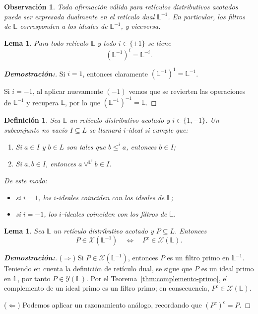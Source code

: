 \documentclass[12pt]{book}
\newtheorem{lemma}[theorem]{Lema}
\newtheorem{definition}[theorem]{Definición}
\newtheorem{remark}[theorem]{Observación}
\begin{document}
\begin{remark} Toda afirmación válida para retículos distributivos acotados puede ser expresada dualmente en el retículo  dual \( \mathbb{L}^{-1} \).
En particular, los filtros de \( \mathbb{L} \) corresponden a los ideales de \( \mathbb{L}^{-1} \),
y viceversa.
\end{remark}

\begin{lemma}\label{lem:Li-dual}
Para todo retículo $\mathbb{L}$ y todo $i\in\{\pm1\}$ se tiene
\[
(\mathbb{L}^{-1})^{i}=\mathbb{L}^{-i}.
\]
\end{lemma}

\begin{proof}[{\textbf{Demostración:}}]
Si $i=1$, entonces claramente $(\mathbb{L}^{-1})^{1}=\mathbb{L}^{-1}$.

Si $i=-1$, al aplicar nuevamente $(-1)$ vemos que se revierten las operaciones de $\mathbb{L}^{-1}$ y recupera $\mathbb{L}$, por lo que $\left(\mathbb{L}^{-1}\right)^{-1}=\mathbb{L}$.
\end{proof}

\begin{definition}\label{def:i-ideal}
Sea $\mathbb{L}$ un retículo distributivo acotado y $i\in\{1,-1\}$.
Un subconjunto no vacío $I\subseteq L$ se llamará \emph{$i$-ideal} si cumple que:
\begin{enumerate}[\normalfont 1)]
\item Si $a\in I$ y $b\in L$ son tales que $b\le^i a$, entonces $b\in I$;
\item Si $a,b\in I$, entonces $a\vee^{\mathbb{L}^i} b\in I$.
\end{enumerate}
De este modo:
\begin{itemize}
  \item si $i=1$, los $i$-ideales coinciden con los ideales de $\mathbb{L}$;
  \item si $i=-1$, los $i$-ideales coinciden con los filtros de $\mathbb{L}$.
\end{itemize}
\end{definition}


\begin{lemma}\label{lem:primos-op-complemento}
Sea $\mathbb{L}$ un retículo distributivo acotado y $P\subseteq L$.
Entonces
\[
P \in \mathcal{X}(\mathbb{L}^{-1})
\quad\Longleftrightarrow\quad
P^c \in \mathcal{X}(\mathbb{L}).
\]
\end{lemma}

\begin{proof}[{\textbf{Demostración:}}]
\noindent(\(\Rightarrow\))  
Si \(P\in\mathcal{X}(\mathbb{L}^{-1})\), entonces \(P\) es un filtro primo en \(\mathbb{L}^{-1}\). Teniendo en cuenta la definición de retículo dual, se sigue que $P$ es un ideal primo en \(\mathbb{L}\), por tanto \(P \in \mathcal{Y}(\mathbb{L})\).
Por el Teorema~\ref{thm:complemento-primo}, el complemento de un ideal primo
es un filtro primo; en consecuencia, \(P^{c}\in\mathcal{X}(\mathbb L)\).

\medskip
\noindent(\(\Leftarrow\))  
Podemos aplicar un razonamiento análogo, recordando que $(P^c)^c=P$.
\end{proof}
\end{document}
